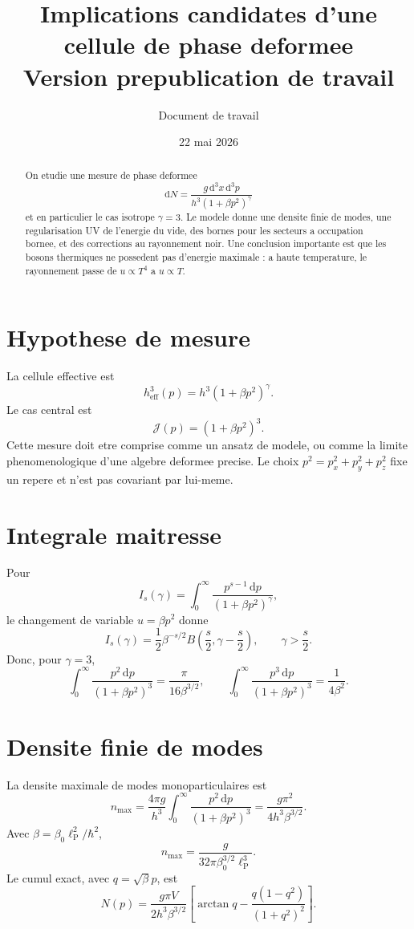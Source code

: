 \documentclass[11pt,a4paper]{article}
\title{Implications candidates d'une cellule de phase deformee\\\large Version prepublication de travail}
\author{Document de travail}
\date{22 mai 2026}
\newcommand{\dd}{\mathrm{d}}
\newcommand{\lp}{\ell_{\mathrm P}}
\newcommand{\heff}{h_{\mathrm{eff}}}
\newcommand{\J}{\mathcal{J}}
\begin{document}
\maketitle

\begin{abstract}
On etudie une mesure de phase deformee
\[
\dd N=\frac{g\,\dd^3x\,\dd^3p}{h^3(1+\beta p^2)^\gamma}
\]
et en particulier le cas isotrope $\gamma=3$. Le modele donne une densite finie de modes, une regularisation UV de l'energie du vide, des bornes pour les secteurs a occupation bornee, et des corrections au rayonnement noir. Une conclusion importante est que les bosons thermiques ne possedent pas d'energie maximale : a haute temperature, le rayonnement passe de $u\propto T^4$ a $u\propto T$.
\end{abstract}

\section{Hypothese de mesure}
La cellule effective est
\[
\heff^3(p)=h^3(1+\beta p^2)^\gamma.
\]
Le cas central est
\[
\J(p)=(1+\beta p^2)^3.
\]
Cette mesure doit etre comprise comme un ansatz de modele, ou comme la limite phenomenologique d'une algebre deformee precise. Le choix $p^2=p_x^2+p_y^2+p_z^2$ fixe un repere et n'est pas covariant par lui-meme.

\section{Integrale maitresse}
Pour
\[
I_s(\gamma)=\int_0^\infty \frac{p^{s-1}\,\dd p}{(1+\beta p^2)^\gamma},
\]
le changement de variable $u=\beta p^2$ donne
\[
I_s(\gamma)=\frac12\beta^{-s/2}B\left(\frac{s}{2},\gamma-\frac{s}{2}\right),\qquad \gamma>\frac{s}{2}.
\]
Donc, pour $\gamma=3$,
\[
\int_0^\infty \frac{p^2\,\dd p}{(1+\beta p^2)^3}=\frac{\pi}{16\beta^{3/2}},\qquad
\int_0^\infty \frac{p^3\,\dd p}{(1+\beta p^2)^3}=\frac{1}{4\beta^2}.
\]

\section{Densite finie de modes}
La densite maximale de modes monoparticulaires est
\[
 n_{\max}=\frac{4\pi g}{h^3}\int_0^\infty \frac{p^2\,\dd p}{(1+\beta p^2)^3}
=\frac{g\pi^2}{4h^3\beta^{3/2}}.
\]
Avec $\beta=\beta_0\lp^2/\hbar^2$,
\[
 n_{\max}=\frac{g}{32\pi\beta_0^{3/2}\lp^3}.
\]
Le cumul exact, avec $q=\sqrt{\beta}p$, est
\[
N(p)=\frac{g\pi V}{2h^3\beta^{3/2}}\left[\arctan q-\frac{q(1-q^2)}{(1+q^2)^2}\right].
\]
\end{document}
